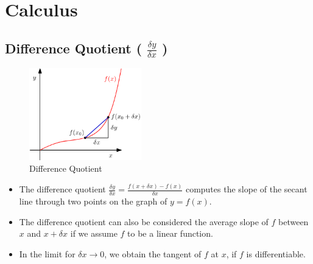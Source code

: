 \chapter{Calculus}

\section{Difference Quotient ( $\displaystyle\frac{\delta y}{\delta x}$ )}\label{Difference Quotient}

\begin{table}[H]
    \begin{minipage}{0.39\linewidth}
        \begin{figure}[H]
            \centering
            \includegraphics[height=4cm]{Pictures/maths/Difference Quotient.png}
            \caption{Difference Quotient}
        \end{figure}
    \end{minipage}
    \hfill
    \begin{minipage}{0.59\linewidth}
        \begin{itemize}
            \item The difference quotient \( \displaystyle\frac{\delta y}{\delta x} = \displaystyle\frac{f(x + \delta x) - f(x)}{\delta x} \) computes the slope of the secant line through two points on the graph of $y = f(x)$. 
            
            \item The difference quotient can also be considered the average slope of $f$ between $x$ and $x + \delta x$ if we assume $f$ to be a linear function. 
            
            \item In the limit for $\delta x \rightarrow 0$, we obtain the tangent of $f$ at $x$, if $f$ is differentiable.

        \end{itemize}
    \end{minipage}
\end{table}



